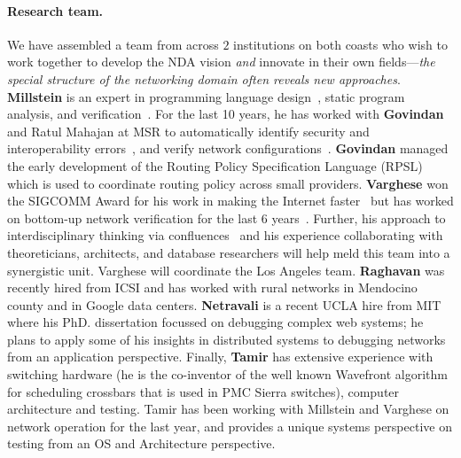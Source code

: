 \paragraph*{Research team.}  We have assembled a team from across $2$ institutions on both coasts who wish to work together to develop the NDA vision {\em and} innovate in their own fields---{\em the special structure of the networking domain often reveals new approaches}. {\bf Millstein} is an expert in programming language design~\cite{expanders,jpred,planb}, static program analysis, and verification~\cite{Ball:2001,rhodium,javacop,DBLP:conf/cav/LesaniMP14}. For the last 10 years, he has worked with {\bf Govindan} and Ratul Mahajan at MSR to automatically identify security and interoperability errors~\cite{DBLP:conf/sigcomm/KothariMMGM11, DBLP:conf/nsdi/PedrosaFKGMM15}, and verify network configurations~\cite{batfish,propane}.
{\bf Govindan} managed the early development of the  Routing Policy Specification Language (RPSL) which is used to coordinate routing policy across small providers.    {\bf Varghese} won the SIGCOMM Award for his work in making the Internet faster~\cite{confluence,varghesebook} but has worked on bottom-up network verification for the last 6 years~\cite{hsa,nod,surgeries}.  Further, his approach  to interdisciplinary thinking via confluences~\cite{confluence} and his experience collaborating with theoreticians, architects, and database researchers will help meld this team into a synergistic unit. Varghese will coordinate the Los Angeles team.
{\bf Raghavan} was recently hired from ICSI and has worked with rural networks in Mendocino county and in  Google data centers.  {\bf Netravali} is a recent UCLA hire from MIT where his PhD. dissertation focussed on debugging complex web systems; he plans to apply some of his insights in distributed systems to debugging networks from an application perspective. Finally, {\bf Tamir} has extensive experience with switching hardware (he is the co-inventor of the well known Wavefront algorithm for scheduling crossbars that is used in PMC Sierra switches), computer architecture and testing. Tamir has been working with Millstein and Varghese on network operation for the last year,
and provides a unique systems perspective on testing from an OS and Architecture
perspective.
